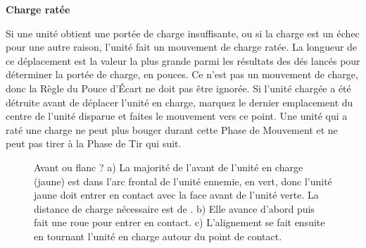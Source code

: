 \noindent\textbf{Charge ratée}

Si une unité obtient une portée de charge insuffisante, ou si la charge est un échec pour une autre raison, l'unité fait un mouvement de charge ratée. La longueur de ce déplacement est la valeur la plus grande parmi les résultats des dés lancés pour déterminer la portée de charge, en pouces.  Ce n'est pas un mouvement de charge, donc la Règle du Pouce d'Écart ne doit pas être ignorée. Si l'unité chargée a été détruite avant de déplacer l'unité en charge, marquez le dernier emplacement du centre de l'unité disparue et faites le mouvement vers ce point. Une unité qui a raté une charge ne peut plus bouger durant cette Phase de Mouvement et ne peut pas tirer à la Phase de Tir qui suit.

\newcommand{\chargefrontageA}{a)}
\newcommand{\chargefrontageB}{b)}
\newcommand{\chargefrontageC}{c)}
\newcommand{\majorityoffrontageingreenunitsfrontarc}{\normalfontsize{La majorité de l'avant est dans l'arc frontal de l'unité verte}}

\vspace*{1cm}
\begin{figure}[!htbp]
\centering
\def\svgwidth{\textwidth}

\caption{Avant ou flanc ?\vspace*{10pt}\newline
a) La majorité de l'avant de l'unité en charge (jaune) est dans l'arc frontal de l'unité ennemie, en vert, donc l'unité jaune doit entrer en contact avec la face avant de l'unité verte. La distance de charge nécessaire est de .\vspace*{10pt}\newline
b) Elle avance d'abord puis fait une roue pour entrer en contact.\vspace*{10pt}\newline
c) L'alignement se fait ensuite en tournant l'unité en charge autour du point de contact.}
\label{figure/chargefrontage}
\end{figure}

\newcommand{\chargealignmentA}{a)}
\newcommand{\chargealignmentB}{b)}
\newcommand{\chargealignmentOne}{1}
\newcommand{\chargealignmentTwo}{2}
\newcommand{\chargealignmentThree}{3}
\newcommand{\chargealignmentImpassableTerrain}{\smallfontsize{Terrain Infranchissable}}
\newcommand{\chargealignmentCharge}{\flufffont{Charge !}}

